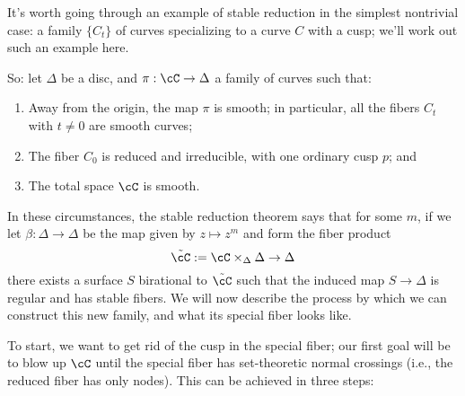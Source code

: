It's worth going through an example of stable reduction in the simplest nontrivial case: a family $\{C_t\}$ of curves specializing to a curve $C$ with a cusp; we'll work out such an example here.

So: let $\Delta$ be a disc, and $\pi : \cC \to \Delta$ a family of curves such that:
\begin{enumerate}
\item Away from the origin, the map $\pi$ is smooth; in particular, all the fibers $C_t$ with $t \neq 0$ are smooth curves;
\item The fiber $C_0$ is reduced and irreducible, with one ordinary cusp $p$; and
\item The total space $\cC$ is smooth.
\end{enumerate}

In these circumstances, the stable reduction theorem says that for some $m$, if we let $\beta : \Delta \to \Delta$ be the map given by $z \mapsto z^m$ and form the fiber product
$$
\tilde \cC := \cC \times_\Delta \Delta \to \Delta
$$
there exists a surface $S$ birational to $\tilde \cC$ such that the induced map $S \to \Delta$ is regular and has stable fibers. We will now describe the process by which we can construct this new family, and what its special fiber looks like.


To start, we want to get rid of the cusp in the special fiber; our first goal will be to blow up $\cC$ until the special fiber has set-theoretic normal crossings (i.e., the reduced fiber has only nodes). This can be achieved in three steps:

